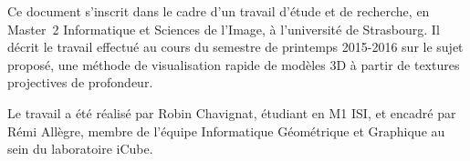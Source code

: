 Ce document s'inscrit dans le cadre d'un travail d'étude et de recherche, en Master~2 Informatique et Sciences de l'Image, à
l'université de Strasbourg. Il décrit le travail effectué au cours du semestre de printemps 2015-2016 sur le sujet proposé,
une méthode de visualisation rapide de modèles 3D à partir de textures projectives de profondeur.

Le travail a été réalisé par Robin Chavignat, étudiant en M1 ISI, et encadré par Rémi Allègre, membre de l'équipe Informatique
Géométrique et Graphique au sein du laboratoire iCube.
